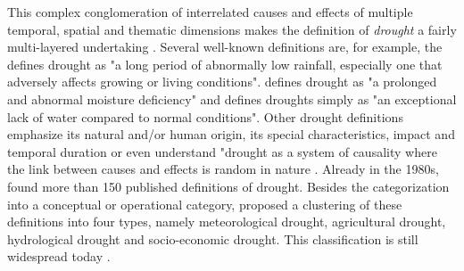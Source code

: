 This complex conglomeration of interrelated causes and effects of multiple temporal, spatial and thematic dimensions makes the definition of \textit{drought} a fairly multi-layered undertaking \autocite{balintMonitoringDroughtCombined2013}. Several well-known definitions are, for example, the \autocite{theamericanheritagedictionaryoftheenglishlanguageDrought2022} defines drought as "a long period of abnormally low rainfall, especially one that adversely affects growing or living conditions". \autocite[2]{palmerMeteorologicalDrought1965} defines drought as "a prolonged and abnormal moisture deficiency" and \autocite{vanloonDroughtHumanmodifiedWorld2016} defines droughts simply as "an exceptional lack of water compared to normal conditions". Other drought definitions emphasize its natural and/or human origin, its special characteristics, impact and temporal duration or even understand "drought as a system of causality where the link between causes and effects is random in nature \autocites{balintMonitoringDroughtCombined2013}[3]{balintMonitoringDroughtCombined2013, baltiReviewDroughtMonitoring2020, idmpDroughtWaterScarcity2022,loonDroughtAnthropocene2016, wangPropagationDroughtMeteorological2016, wilhiteUnderstandingDroughtPhenomenon1985}. Already in the 1980s, \autocite{wilhiteUnderstandingDroughtPhenomenon1985} found more than 150 published definitions of drought. Besides the categorization into a conceptual or operational category, \autocite{wilhiteUnderstandingDroughtPhenomenon1985} proposed a clustering of these definitions into four types, namely meteorological drought, agricultural drought, hydrological drought and socio-economic drought. This classification is still widespread today \autocite{balintMonitoringDroughtCombined2013, baltiReviewDroughtMonitoring2020,idmpDroughtWaterScarcity2022,vereintenationenSpecialReportDrought2021}.\newline
